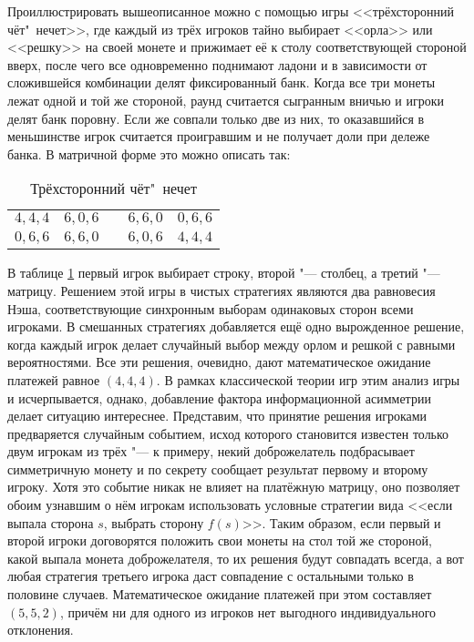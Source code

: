 Проиллюстрировать вышеописанное можно с помощью игры <<трёхсторонний чёт"~нечет>>, где каждый из трёх игроков тайно выбирает <<орла>> или <<решку>> на своей монете и прижимает её к столу соответствующей стороной вверх, после чего все одновременно поднимают ладони и в зависимости от сложившейся комбинации делят фиксированный банк. Когда все три монеты лежат одной и той же стороной, раунд считается сыгранным вничью и игроки делят банк поровну. Если же совпали только две из них, то оказавшийся в меньшинстве игрок считается проигравшим и не получает доли при дележе банка. В матричной форме это можно описать так:
\begin{table} [htbp]
	\centering
	\begin{threeparttable}
		\caption{Трёхсторонний чёт"~нечет}
		\label{tab:coin3}
		\begin{tabular}{ |c|c|c|c|c| }
			\cline{1-2} \cline{4-5}
			\rule[-7pt]{0pt}{2em}$4, 4, 4$ &
			\rule[-7pt]{0pt}{2em}$6, 0, 6$ & \qquad\qquad\qquad &
			\rule[-7pt]{0pt}{2em}$6, 6, 0$ &
			\rule[-7pt]{0pt}{2em}$0, 6, 6$ \\
			\cline{1-2} \cline{4-5}
			\rule[-7pt]{0pt}{2em}$0, 6, 6$ &
			\rule[-7pt]{0pt}{2em}$6, 6, 0$ & \qquad\qquad\qquad &
			\rule[-7pt]{0pt}{2em}$6, 0, 6$ &
			\rule[-7pt]{0pt}{2em}$4, 4, 4$ \\
			\cline{1-2} \cline{4-5}
		\end{tabular}
	\end{threeparttable}
\end{table}

В таблице \ref{tab:coin3} первый игрок выбирает строку, второй "--- столбец, а третий "--- матрицу. Решением этой игры в чистых стратегиях являются два равновесия Нэша, соответствующие синхронным выборам одинаковых сторон всеми игроками. В смешанных стратегиях добавляется ещё одно вырожденное решение, когда каждый игрок делает случайный выбор между орлом и решкой с равными вероятностями. Все эти решения, очевидно, дают математическое ожидание платежей равное $(4,4,4)$. В рамках классической теории игр этим анализ игры и исчерпывается, однако, добавление фактора информационной асимметрии делает ситуацию интереснее. Представим, что принятие решения игроками предваряется случайным событием, исход которого становится известен только двум игрокам из трёх "--- к примеру, некий доброжелатель подбрасывает симметричную монету и по секрету сообщает результат первому и второму игроку. Хотя это событие никак не влияет на платёжную матрицу, оно позволяет обоим узнавшим о нём игрокам использовать условные стратегии вида <<если выпала сторона $s$, выбрать сторону $f(s)$>>. Таким образом, если первый и второй игроки договорятся положить свои монеты на стол той же стороной, какой выпала монета доброжелателя, то их решения будут совпадать всегда, а вот любая стратегия третьего игрока даст совпадение с остальными только в половине случаев. Математическое ожидание платежей при этом составляет $(5,5,2)$, причём ни для одного из игроков нет выгодного индивидуального отклонения.


